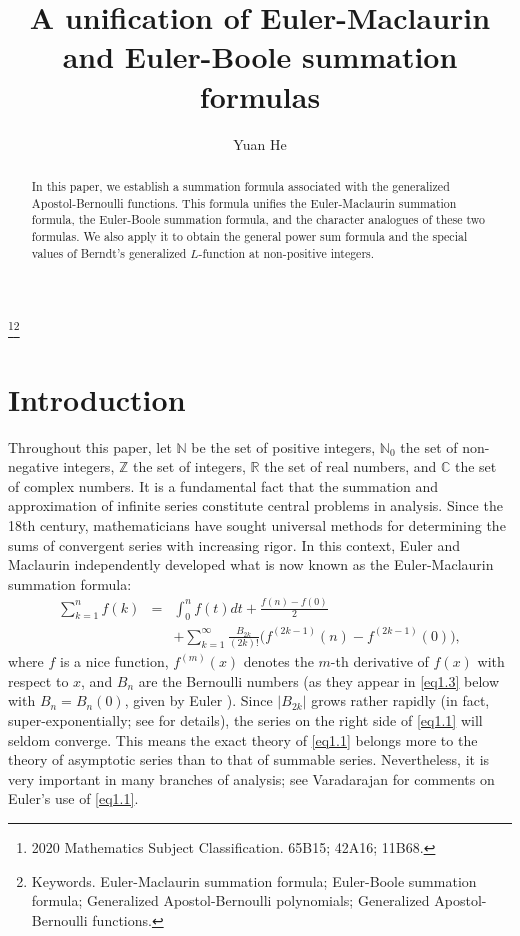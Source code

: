 \documentclass[reqno]{amsart}
\numberwithin{equation}{section}
\begin{document}
\setcounter{page}{1}

\title[A unification of summation formulas]{A unification of Euler-Maclaurin and Euler-Boole summation formulas }
\thanks{2020 Mathematics Subject Classification. 65B15; 42A16; 11B68.}\thanks{Keywords. Euler-Maclaurin summation formula; Euler-Boole summation formula; Generalized Apostol-Bernoulli polynomials; Generalized Apostol-Bernoulli functions.}
\author{Yuan He}
\address{School of Mathematics and Big Data, Neijiang Normal University, Neijiang 641100, Sichuan, People's Republic of China}

\begin{abstract}
In this paper, we establish a summation formula associated with the generalized Apostol-Bernoulli functions. This formula unifies the Euler-Maclaurin summation formula, the Euler-Boole summation formula, and the character analogues of these two formulas. We also apply it to obtain the general power sum formula and the special values of Berndt's generalized $L$-function at non-positive integers.
\end{abstract}

\maketitle

\section{Introduction}\label{sec1}

Throughout this paper, let $\mathbb{N}$ be the set of positive integers, $\mathbb{N}_{0}$ the set of non-negative integers, $\mathbb{Z}$ the set of integers, $\mathbb{R}$ the set of real numbers, and $\mathbb{C}$ the set of complex numbers. It is a fundamental fact that the summation and approximation of infinite series constitute central problems in analysis. Since the 18th century, mathematicians have sought universal methods for determining the sums of convergent series with increasing rigor. In this context, Euler \cite{euler1} and Maclaurin \cite{maclaurin} independently developed what is now known as the Euler-Maclaurin summation formula:
\begin{eqnarray}\label{eq1.1}
\sum_{k=1}^{n}f(k)&=&\int_{0}^{n}f(t)dt+\frac{f(n)-f(0)}{2}\nonumber\\
&&+\sum_{k=1}^{\infty}\frac{B_{2k}}{(2k)!}\bigl(f^{(2k-1)}(n)-f^{(2k-1)}(0)\bigl),
\end{eqnarray}
where $f$ is a nice function, $f^{(m)}(x)$ denotes the $m$-th derivative of $f(x)$ with respect to $x$, and $B_{n}$ are the Bernoulli numbers (as they appear in \eqref{eq1.3} below with $B_{n}=B_{n}(0)$, given by Euler \cite{euler4}).
Since $|B_{2k}|$ grows rather rapidly (in fact, super-exponentially; see \cite[p. 267]{apostol3} for details), the series on the right side of \eqref{eq1.1} will seldom converge. This means the exact theory of \eqref{eq1.1} belongs more to the theory of asymptotic series than to that of summable series. Nevertheless, it is very important in many branches of analysis; see Varadarajan \cite{varadarajan} for comments on Euler's use of \eqref{eq1.1}.
\end{document}
